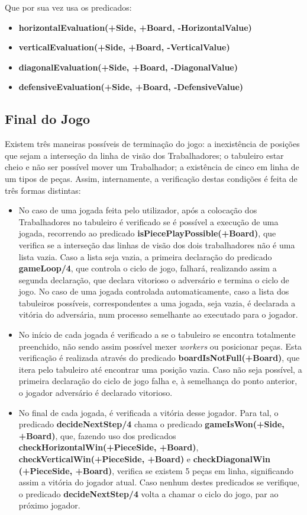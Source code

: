 \documentclass[a4paper]{article}
\begin{document}
Que por sua vez usa os predicados:
\begin{itemize}
	\item \textbf{horizontalEvaluation(+Side, +Board, -HorizontalValue)}
	\item \textbf{verticalEvaluation(+Side, +Board, -VerticalValue)}
	\item \textbf{diagonalEvaluation(+Side, +Board, -DiagonalValue)}
	\item \textbf{defensiveEvaluation(+Side, +Board, -DefensiveValue)}
\end{itemize}

\newpage

\subsection{Final do Jogo}

Existem três maneiras possíveis de terminação do jogo: a inexistência  de posições que sejam a interseção da linha de visão dos Trabalhadores; o tabuleiro estar cheio e não ser possível mover um Trabalhador; a existência de cinco em linha de um tipos de peças.
Assim, internamente, a verificação destas condições é feita de três formas distintas:
\begin{itemize}
	\item No caso de uma jogada feita pelo utilizador, após a colocação dos Trabalhadores no tabuleiro é verificado se é possível a execução de uma jogada, recorrendo ao predicado \textbf{isPiecePlayPossible(+Board)}, que verifica se a interseção das linhas de visão dos dois trabalhadores não é uma lista vazia. Caso a lista seja vazia, a primeira declaração do predicado \textbf{gameLoop/4}, que controla o ciclo de jogo, falhará, realizando assim a segunda declaração, que declara vitorioso o adversário e termina o ciclo de jogo. No caso de uma jogada controlada automaticamente, caso a lista dos tabuleiros possíveis, correspondentes a uma jogada, seja vazia, é declarada a vitória do adversária, num processo semelhante ao executado para o jogador.
	\item No início de cada jogada é verificado a se o tabuleiro se encontra totalmente preenchido, não sendo assim possível mexer \textit{workers} ou posicionar peças. Esta verificação é realizada através do predicado \textbf{boardIsNotFull(+Board)}, que itera pelo tabuleiro até encontrar uma posição vazia. Caso não seja possível, a primeira declaração do ciclo de jogo falha e, à semelhança do ponto anterior, o jogador adversário é declarado vitorioso.
	\item No final de cada jogada, é verificada a vitória desse jogador. Para tal, o predicado \textbf{decideNextStep/4} chama o predicado \textbf{gameIsWon(+Side, +Board)}, que, fazendo uso dos predicados \textbf{checkHorizontalWin(+PieceSide, +Board)}, \textbf{checkVerticalWin(+PieceSide, +Board)} e \textbf{checkDiagonalWin (+PieceSide, +Board)}, verifica se existem 5 peças em linha, significando assim a vitória do jogador atual. Caso nenhum destes predicados se verifique, o predicado \textbf{decideNextStep/4} volta a chamar o ciclo do jogo, par ao próximo jogador.
\end{itemize}
\end{document}
